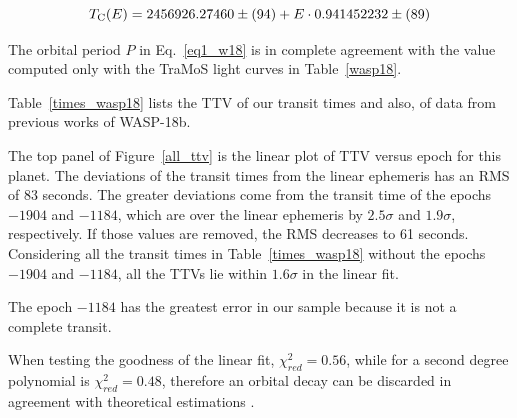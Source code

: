 \begin{equation} \label{eq1_w18}
T_{\rm C}(E)=2456926.27460\pm(94)+E \cdot 0.941452232\pm(89)
\end{equation}

The orbital period $P$ in Eq.~\ref{eq1_w18} is in complete agreement with the value computed only with the TraMoS light curves in Table~\ref{wasp18}.

Table~\ref{times_wasp18} lists the TTV of our transit times and also, of data from previous works \citep{Triaud2010,Hellier2009,Maxted2013b} of WASP-18b. 

The top panel of Figure~\ref{all_ttv} is the linear plot of TTV versus epoch for this planet. The deviations of the transit times from the linear ephemeris has an RMS of 83 seconds. The greater deviations come from the transit time of the epochs $-1904$ and $-1184$, which are over the linear ephemeris by $2.5\sigma$ and $1.9\sigma$, respectively. If those values are removed, the RMS decreases to 61 seconds. Considering all the transit times in Table~\ref{times_wasp18} without the epochs $-1904$ and $-1184$, all the TTVs lie within $1.6\sigma$ in the linear fit. 

The epoch $-1184$ has the greatest error in our sample because it is not a complete transit.

When testing the goodness of the linear fit, $\chi^{2}_{red} =0.56$, while for a second degree polynomial is $\chi^{2}_{red}=0.48$, therefore an orbital decay can be discarded in agreement with theoretical estimations \citep{CollierCameron2018}.  

